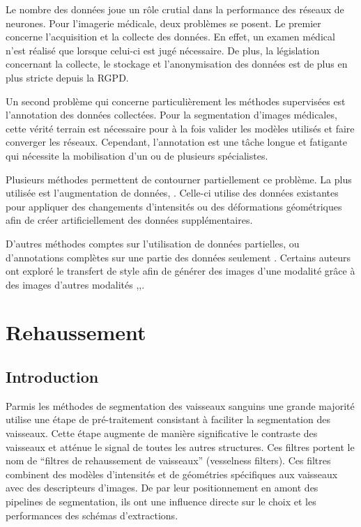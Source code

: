 Le nombre des données joue un rôle crutial dans la performance des réseaux de neurones. Pour l'imagerie médicale, deux problèmes se posent. Le premier concerne l'acquisition et la collecte des données. En effet, un examen médical n'est réalisé que lorsque celui-ci est jugé nécessaire. De plus, la législation concernant la collecte, le stockage et l'anonymisation des données est de plus en plus stricte depuis la RGPD.

Un second problème qui concerne particulièrement les méthodes supervisées est l'annotation des données collectées. Pour la segmentation d'images médicales, cette vérité terrain est nécessaire pour à la fois valider les modèles utilisés et faire converger les réseaux. Cependant, l'annotation est une tâche longue et fatigante qui nécessite la mobilisation d'un ou de plusieurs spécialistes.

Plusieurs méthodes permettent de contourner partiellement ce problème. La plus utilisée est l'augmentation de données, \cite{Liskowski2016_data_augmentation}. Celle-ci utilise des données existantes pour appliquer des changements d'intensités ou des déformations géométriques afin de créer artificiellement des données supplémentaires.

D'autres méthodes comptes sur l'utilisation de données partielles, ou d'annotations complètes sur une partie des données seulement \cite{Tajbakhsh2020_imperfect_datasets}. Certains auteurs ont exploré le transfert de style afin de générer des images d'une modalité grâce à des images d'autres modalités \cite{Chartsias2017_heart_adversarial_im},\cite{Huo2018_adversarial},\cite{Perone2019_unsupervised}.

\section{Rehaussement}
\label{sec:EA:rehaussement}
\subsection{Introduction}
\label{sec:EA:rehaussement:introduction}

Parmis les méthodes de segmentation des vaisseaux sanguins une grande majorité utilise une étape de pré-traitement consistant à faciliter la segmentation des vaisseaux. Cette étape augmente de manière significative le contraste des vaisseaux et atténue le signal de toutes les autres structures. Ces filtres portent le nom de ``filtres de rehaussement de vaisseaux'' (vesselness filters). Ces filtres combinent des modèles d'intensités et de géométries spécifiques aux vaisseaux avec des descripteurs d'images. De par leur positionnement en amont des pipelines de segmentation, ils ont une influence directe sur le choix et les performances des schémas d'extractions.


